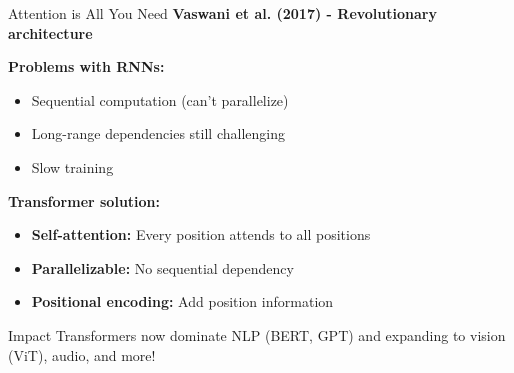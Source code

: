 \documentclass[aspectratio=169]{beamer}
\begin{document}
\begin{frame}{Attention is All You Need}
  \textbf{Vaswani et al. (2017) - Revolutionary architecture}

  \vspace{0.5em}

  \textbf{Problems with RNNs:}
  \begin{itemize}
    \item Sequential computation (can't parallelize)
    \item Long-range dependencies still challenging
    \item Slow training
  \end{itemize}

  \vspace{0.5em}

  \textbf{Transformer solution:}
  \begin{itemize}
    \item \textbf{Self-attention:} Every position attends to all positions
    \item \textbf{Parallelizable:} No sequential dependency
    \item \textbf{Positional encoding:} Add position information
  \end{itemize}

  \vspace{0.5em}

  \begin{block}{Impact}
    Transformers now dominate NLP (BERT, GPT) and expanding to vision (ViT), audio, and more!
  \end{block}
\end{frame}
\end{document}
